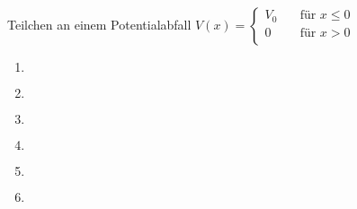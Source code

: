 \documentclass{alex_hü}
\begin{document}
\begin{mybox}{Teilchen an einem Potentialabfall}
	\centering \( V(x) = \begin{cases}
		V_0 \quad &\text{für } x \leq 0 \\
		0 \quad &\text{für }  x > 0 \\
	\end{cases} \)
	\tcblower
	\begin{enumerate}
		\item \(  \)
	\tcbline
		\item \(  \)
	\tcbline
		\item \(  \)
	\tcbline
		\item \(  \)
	\tcbline
		\item \(  \)
	\tcbline
		\item \(  \)
	\end{enumerate}
\end{mybox}
\end{document}
